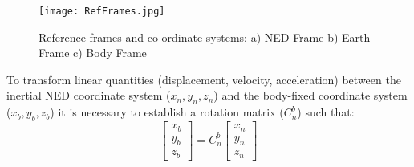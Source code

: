 \begin{figure}[htb]
	\texttt{[image: RefFrames.jpg]}%
	\caption{Reference frames and co-ordinate systems: a) NED Frame b) Earth Frame c) Body Frame}%
	\label{fig:RefFrames}%
\end{figure}

To transform linear quantities (displacement, velocity, acceleration) between the inertial NED coordinate system ($x_{n}, y_{n}, z_{n}$) and the body-fixed coordinate system ($x_{b}, y_{b}, z_{b}$) it is necessary to establish a rotation matrix ($C^{b}_{n}$) such that:
\[
\begin{bmatrix}
x_{b}\\ y_{b}\\ z_{b}
\end{bmatrix} = C^{b}_{n}\begin{bmatrix}
x_{n}\\ y_{n}\\ z_{n}
\end{bmatrix}
\]

